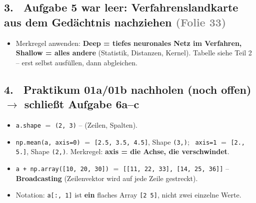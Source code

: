 \documentclass[10pt,a4paper]{article}
\newcommand{\folie}[1]{\textcolor{gray}{\footnotesize(#1)}}
\newcommand{\checkbox}{\raisebox{-1pt}{\fbox{\rule{0pt}{7pt}\rule{7pt}{0pt}}}\hspace{6pt}}
\begin{document}
\subsection*{3. \ Aufgabe 5 war leer: Verfahrenslandkarte aus dem Gedächtnis nachziehen \folie{Folie 33}}
\begin{itemize}
  \item[\checkbox] Merkregel anwenden: \textbf{Deep = tiefes neuronales Netz im Verfahren, Shallow = alles andere} (Statistik, Distanzen, Kernel). Tabelle siehe Teil 2 -- erst selbst ausfüllen, dann abgleichen.
\end{itemize}

\subsection*{4. \ Praktikum 01a/01b nachholen (noch offen) $\to$ schließt Aufgabe 6a--c}
\begin{itemize}
  \item[\checkbox] \texttt{a.shape} $=$ \texttt{(2, 3)} -- (Zeilen, Spalten).
  \item[\checkbox] \texttt{np.mean(a, axis=0)} $=$ \texttt{[2.5, 3.5, 4.5]}, Shape \texttt{(3,)}; \ \texttt{axis=1} $=$ \texttt{[2., 5.]}, Shape \texttt{(2,)}. Merkregel: \textbf{axis = die Achse, die verschwindet}.
  \item[\checkbox] \texttt{a + np.array([10, 20, 30])} $=$ \texttt{[[11, 22, 33], [14, 25, 36]]} -- \textbf{Broadcasting} (Zeilenvektor wird auf jede Zeile gestreckt).
  \item[\checkbox] Notation: \texttt{a[:, 1]} ist \textbf{ein} flaches Array \texttt{[2 5]}, nicht zwei einzelne Werte.
\end{itemize}
\end{document}
